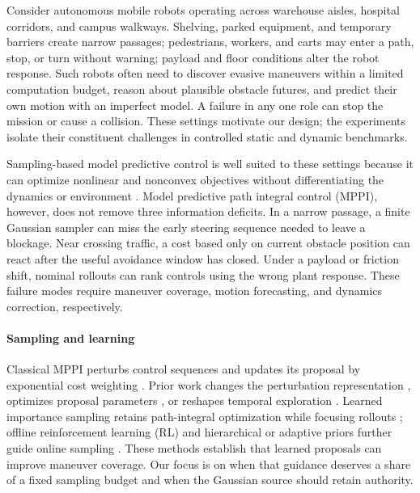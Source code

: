 \documentclass[conference]{IEEEtran}
\begin{document}
Consider autonomous mobile robots operating across warehouse aisles, hospital corridors, and campus walkways. Shelving, parked equipment, and temporary barriers create narrow passages; pedestrians, workers, and carts may enter a path, stop, or turn without warning; payload and floor conditions alter the robot response. Such robots often need to discover evasive maneuvers within a limited computation budget, reason about plausible obstacle futures, and predict their own motion with an imperfect model. A failure in any one role can stop the mission or cause a collision. These settings motivate our design; the experiments isolate their constituent challenges in controlled static and dynamic benchmarks.

Sampling-based model predictive control is well suited to these settings because it can optimize nonlinear and nonconvex objectives without differentiating the dynamics or environment \cite{williams2017mppi,williams2018information}. Model predictive path integral control (MPPI), however, does not remove three information deficits. In a narrow passage, a finite Gaussian sampler can miss the early steering sequence needed to leave a blockage. Near crossing traffic, a cost based only on current obstacle position can react after the useful avoidance window has closed. Under a payload or friction shift, nominal rollouts can rank controls using the wrong plant response. These failure modes require maneuver coverage, motion forecasting, and dynamics correction, respectively.

\paragraph{Sampling and learning} Classical MPPI perturbs control sequences and updates its proposal by exponential cost weighting \cite{williams2017mppi,williams2018information}. Prior work changes the perturbation representation \cite{kim2022smooth}, optimizes proposal parameters \cite{asmar2023mppi}, or reshapes temporal exploration \cite{vlahov2024lowfrequency}. Learned importance sampling retains path-integral optimization while focusing rollouts \cite{carius2021learned}; offline reinforcement learning (RL) and hierarchical or adaptive priors further guide online sampling \cite{qu2024rldriven,min2026holo,serragomez2025adaptive,hori2025hierarchical,seo2026rgb}. These methods establish that learned proposals can improve maneuver coverage. Our focus is on when that guidance deserves a share of a fixed sampling budget and when the Gaussian source should retain authority.
\end{document}
